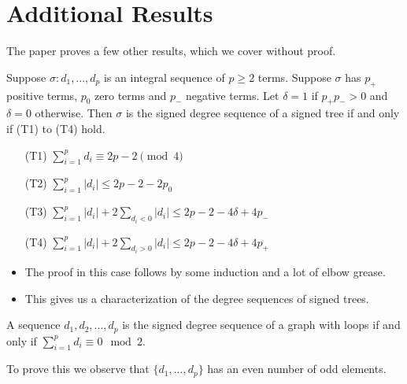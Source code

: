\section{Additional Results}

\begin{frame}
	The paper proves a few other results, which we cover without proof.
		\begin{theorem}
			Suppose $\sigma : d_1,...,d_p$ is an integral sequence of $p \geq 2$ terms. Suppose $\sigma$ has $p_+$ positive terms, $p_0$ zero terms and $p_-$ negative terms. Let $\delta = 1$ if $p_+p_- > 0$ and $\delta = 0$ otherwise. Then $\sigma$ is the signed degree sequence of a signed tree if and only if (T1) to (T4) hold.
			\begin{itemize}
				\item[(T1)] $\sum_{i = 1}^{p} d_i \equiv 2p - 2 \pmod 4$
				\item[(T2)] $\sum_{i = 1}^{p} \lvert d_i \rvert \le 2p - 2 - 2p_0$
				\item[(T3)] $\sum_{i = 1}^{p} \lvert d_i \rvert + 2\sum_{d_i < 0} \lvert d_i \rvert \leq 2p - 2 - 4\delta + 4p_-$
				\item[(T4)] $\sum_{i = 1}^{p} \lvert d_i \rvert + 2\sum_{d_i > 0} \lvert d_i \rvert \leq 2p - 2 - 4\delta + 4p_+$
			\end{itemize}
		\end{theorem}
	\begin{itemize}
		\item The proof in this case follows by some induction and a lot of elbow grease.
		\item This gives us a characterization of the degree sequences of signed trees.
	\end{itemize}
\end{frame}

\begin{frame}
	\begin{theorem}
		A sequence $d_1, d_2, ..., d_p$ is the signed degree sequence of a graph with loops if and only if $\sum_{i = 1}^{p} d_i \equiv 0 \mod 2$.
	\end{theorem}
	To prove this we observe that $\{d_1,...,d_p\}$ has an even number of odd elements.
\end{frame}


